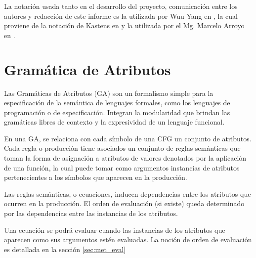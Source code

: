 La notación usada tanto en el desarrollo del proyecto, comunicación entre los autores y redacción de este informe es la utilizada por Wuu Yang en \cite{wuu-yang1}, la cual proviene de la notación de Kastens en \cite{kastens} y la utilizada por el Mg. Marcelo Arroyo en \cite{tesismarcelo}.

\section{Gramática de Atributos}

Las Gramáticas de Atributos (GA) son un formalismo simple para la especificación de la semántica de lenguajes formales, como los lenguajes de programación o de especificación. Integran la modularidad que brindan las gramáticas libres de contexto y la expresividad de un lenguaje funcional.

En una GA, se relaciona con cada símbolo de una CFG un conjunto de atributos. Cada regla o producción tiene asociados un conjunto de reglas semánticas que toman la forma de asignación a atributos de valores denotados por la aplicación de una función, la cual puede tomar como argumentos instancias de atributos pertenecientes a los símbolos que aparecen en la producción.

Las reglas semánticas, o ecuaciones, inducen dependencias entre los atributos que ocurren en la producción. El orden de evaluación (si existe) queda determinado por las dependencias entre las instancias de los atributos.

Una ecuación se podrá evaluar cuando las instancias de los atributos que aparecen como sus argumentos estén evaluadas. La noción de orden de evaluación es detallada en la sección \ref{sec:met_eval}

